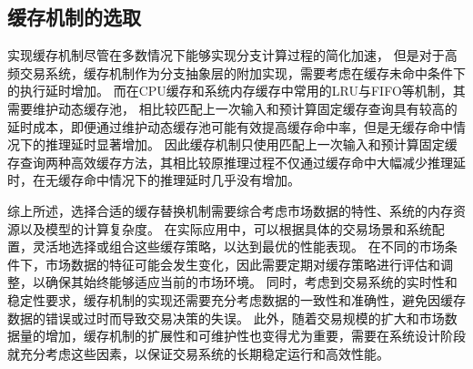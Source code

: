 \subsection{缓存机制的选取}

实现缓存机制尽管在多数情况下能够实现分支计算过程的简化加速，
但是对于高频交易系统，缓存机制作为分支抽象层的附加实现，需要考虑在缓存未命中条件下的执行延时增加。
而在CPU缓存和系统内存缓存中常用的LRU与FIFO等机制，其需要维护动态缓存池，
相比较匹配上一次输入和预计算固定缓存查询具有较高的延时成本，即便通过维护动态缓存池可能有效提高缓存命中率，但是无缓存命中情况下的推理延时显著增加。
因此缓存机制只使用匹配上一次输入和预计算固定缓存查询两种高效缓存方法，其相比较原推理过程不仅通过缓存命中大幅减少推理延时，在无缓存命中情况下的推理延时几乎没有增加。

综上所述，选择合适的缓存替换机制需要综合考虑市场数据的特性、系统的内存资源以及模型的计算复杂度。
在实际应用中，可以根据具体的交易场景和系统配置，灵活地选择或组合这些缓存策略，以达到最优的性能表现。
在不同的市场条件下，市场数据的特征可能会发生变化，因此需要定期对缓存策略进行评估和调整，以确保其始终能够适应当前的市场环境。
同时，考虑到交易系统的实时性和稳定性要求，缓存机制的实现还需要充分考虑数据的一致性和准确性，避免因缓存数据的错误或过时而导致交易决策的失误。
此外，随着交易规模的扩大和市场数据量的增加，缓存机制的扩展性和可维护性也变得尤为重要，需要在系统设计阶段就充分考虑这些因素，以保证交易系统的长期稳定运行和高效性能。
